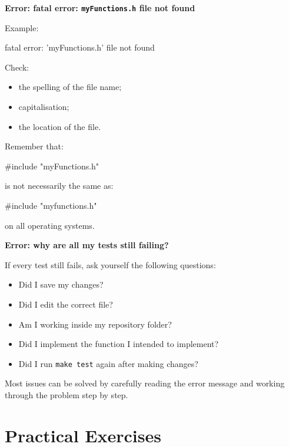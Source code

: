 \documentclass{csc2059practical}
\begin{document}
\begin{commonerror}
\textbf{Error: fatal error: \texttt{myFunctions.h} file not found}

Example:

\begin{terminal}
fatal error: 'myFunctions.h' file not found
\end{terminal}

Check:

\begin{itemize}
  \item the spelling of the file name;
  \item capitalisation;
  \item the location of the file.
\end{itemize}

Remember that:

\begin{cppcode}
#include "myFunctions.h"
\end{cppcode}

is not necessarily the same as:

\begin{cppcode}
#include "myfunctions.h"
\end{cppcode}

on all operating systems.
\end{commonerror}

\begin{commonerror}
\textbf{Error: why are all my tests still failing?}

If every test still fails, ask yourself the following questions:

\begin{itemize}
  \item Did I save my changes?
  \item Did I edit the correct file?
  \item Am I working inside my repository folder?
  \item Did I implement the function I intended to implement?
  \item Did I run \texttt{make test} again after making changes?
\end{itemize}

Most issues can be solved by carefully reading the error message and working through the problem step by step.
\end{commonerror}

\section{Practical Exercises}
\end{document}

